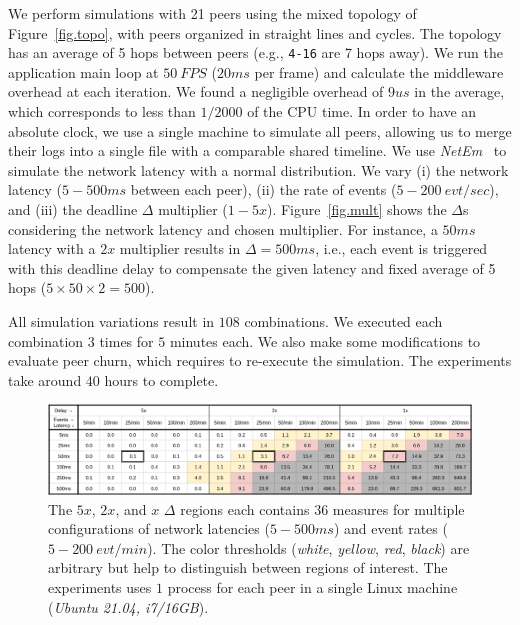 \documentclass[12pt]{article}
\newcommand{\code}[1]  {\texttt{\small{#1}}}
\begin{document}
We perform simulations with 21 peers using the mixed topology of
Figure~\ref{fig.topo}, with peers organized in straight lines and cycles.
The topology has an average of 5 hops between peers (e.g., \code{4-16} are 7
hops away).
%
We run the application main loop at $50~FPS$ ($20ms$ per frame) and calculate
the middleware overhead at each iteration.
We found a negligible overhead of $9us$ in the average, which corresponds to
less than $1/2000$ of the CPU time.
%
In order to have an absolute clock, we use a single machine to simulate all
peers, allowing us to merge their logs into a single file with a comparable
shared timeline.
%
We use \emph{NetEm}~\cite{netem} to simulate the network latency with a normal
distribution.
%
We vary
    (i)   the network latency ($5-500ms$ between each peer),
    (ii)  the rate of events ($5-200~evt/sec$), and
    (iii) the deadline $\Delta$ multiplier ($1-5x$).
%
Figure~\ref{fig.mult} shows the $\Delta$s considering the network latency and
chosen multiplier.
For instance, a $50ms$ latency with a $2x$ multiplier results in
$\Delta=500ms$, i.e., each event is triggered with this deadline delay to
compensate the given latency and fixed average of 5 hops
($5 \times 50 \times 2 = 500$).

All simulation variations result in $108$ combinations.
We executed each combination $3$ times for $5$ minutes each.
We also make some modifications to evaluate peer churn, which requires to
re-execute the simulation.
The experiments take around $40$ hours to complete.


\begin{figure}
  \centering
  \includegraphics[width=0.75\linewidth]{baks}
  \caption{
    \label{fig.baks}
The $5x$, $2x$, and $x$ $\Delta$ regions each contains $36$ measures for
multiple configurations of network latencies ($5-500ms$) and event rates
($5-200~evt/min$).
%
The color thresholds (\emph{white}, \emph{yellow}, \emph{red}, \emph{black})
are arbitrary but help to distinguish between regions of interest.
%
The experiments uses $1$ process for each peer in a single Linux machine
(\emph{Ubuntu 21.04, i7/16GB}).
    }
\end{figure}
\end{document}
